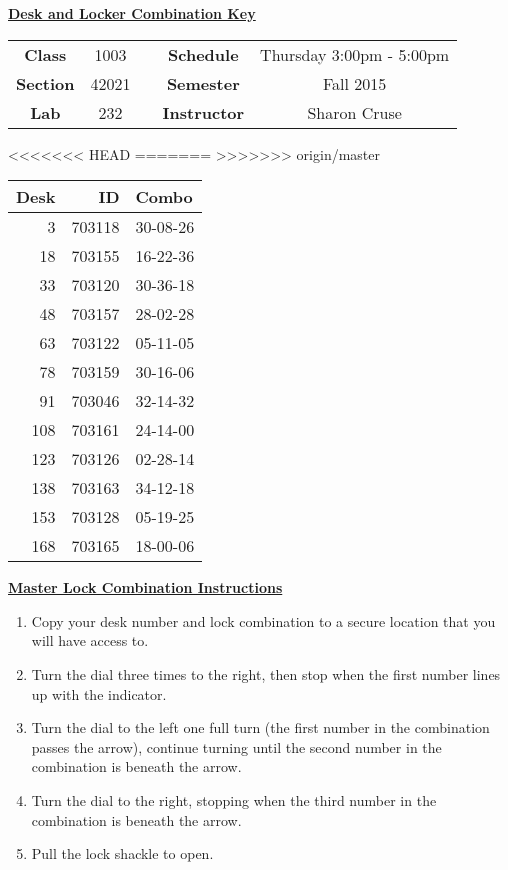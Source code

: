 \documentclass[12pt]{article}
\begin{document}
\thispagestyle{empty}

\begin{center}
	{\huge\textbf{\underline{ Desk and Locker Combination Key}}}
\end{center}


\begin{table}[h]
  \centering
  \begin{tabular}{ccccc}

  \textbf{Class} & 1003 & {\qquad} &\textbf{Schedule} & Thursday 3:00pm - 5:00pm \\
  \textbf{Section} & 42021 & {\qquad} & \textbf{Semester} & Fall 2015 \\
  \textbf{Lab} & 232 & {\qquad} & \textbf{Instructor} & Sharon Cruse \\
  \end{tabular}
\end{table}
<<<<<<< HEAD
 \vspace{0.1in}
=======
 \vspace{0.5in}
>>>>>>> origin/master
\begin{minipage}{0.4\textwidth}

\begin{tabular}{rrl}
\toprule
 Desk &      ID &     Combo \\
\midrule
    3 &  703118 &  30-08-26 \\
   18 &  703155 &  16-22-36 \\
   33 &  703120 &  30-36-18 \\
   48 &  703157 &  28-02-28 \\
   63 &  703122 &  05-11-05 \\
   78 &  703159 &  30-16-06 \\
   91 &  703046 &  32-14-32 \\
  108 &  703161 &  24-14-00 \\
  123 &  703126 &  02-28-14 \\
  138 &  703163 &  34-12-18 \\
  153 &  703128 &  05-19-25 \\
  168 &  703165 &  18-00-06 \\
\bottomrule
\end{tabular}


\end{minipage}
\begin{minipage}{0.4\textwidth}
\underline{{\large \textbf{Master Lock Combination Instructions}}}
\begin{enumerate}
\item Copy your desk number and lock combination to a secure location that you will have access to.
\item Turn the dial three times to the right, then stop when the first number lines up with the indicator.
\item Turn the dial to the left one full turn (the first number in the combination passes the arrow), continue turning until the second number in the combination is beneath the arrow.
\item Turn the dial to the right, stopping when the third number in the combination is beneath the arrow.
\item Pull the lock shackle to open.
\end{enumerate}
\end{minipage}
\end{document}

